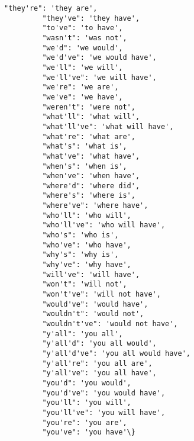\documentclass[11pt]{article}
\begin{document}
\begin{Verbatim}[commandchars=\\\{\}]
         "they're": 'they are',
         "they've": 'they have',
         "to've": 'to have',
         "wasn't": 'was not',
         "we'd": 'we would',
         "we'd've": 'we would have',
         "we'll": 'we will',
         "we'll've": 'we will have',
         "we're": 'we are',
         "we've": 'we have',
         "weren't": 'were not',
         "what'll": 'what will',
         "what'll've": 'what will have',
         "what're": 'what are',
         "what's": 'what is',
         "what've": 'what have',
         "when's": 'when is',
         "when've": 'when have',
         "where'd": 'where did',
         "where's": 'where is',
         "where've": 'where have',
         "who'll": 'who will',
         "who'll've": 'who will have',
         "who's": 'who is',
         "who've": 'who have',
         "why's": 'why is',
         "why've": 'why have',
         "will've": 'will have',
         "won't": 'will not',
         "won't've": 'will not have',
         "would've": 'would have',
         "wouldn't": 'would not',
         "wouldn't've": 'would not have',
         "y'all": 'you all',
         "y'all'd": 'you all would',
         "y'all'd've": 'you all would have',
         "y'all're": 'you all are',
         "y'all've": 'you all have',
         "you'd": 'you would',
         "you'd've": 'you would have',
         "you'll": 'you will',
         "you'll've": 'you will have',
         "you're": 'you are',
         "you've": 'you have'\}
\end{Verbatim}
            
\end{document}
